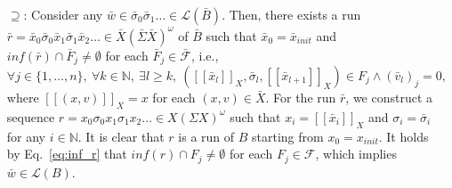 \begin{itemize}

	\item[$ \supseteq $:]
	Consider any $ \bar{w} \in \bar{\sigma}_0 \bar{\sigma}_1 \ldots \in \mathcal{L}(\bar{B}) $.
	Then, there exists a run $ \bar{r} = \bar{x}_0 \bar{\sigma}_0 \bar{x}_1 \bar{\sigma}_1 \bar{x}_2 \ldots \in \bar{X}(\bar{\Sigma} \bar{X})^\omega $ of $ \bar{B} $ such that $ \bar{x}_0 = \bar{x}_{init} $ and $ inf(\bar{r}) \cap \bar{F}_j \neq \emptyset $ for each $ \bar{F}_j \in \bar{\mathcal{F}} $, i.e.,
	\begin{equation}
	\label{eq:inf_r}
	\forall j \in \{1, \ldots, n\}, \
	\forall k \in \mathbb{N}, \ \exists l \geq k, \
	( [\![ \bar{x}_l ]\!]_X , \bar{\sigma}_l, [\![ \bar{x}_{l+1} ]\!]_X) \in F_j \land (\bar{v}_l)_j = 0 ,
	\end{equation}
	where $ [\![ (x,v) ]\!]_X = x $ for each $ (x,v) \in \bar{X} $.
	For the run $ \bar{r} $, we construct a sequence $ r = x_0 \sigma_0 x_1 \sigma_1 x_2 \ldots \in X(\Sigma X)^\omega $ such that $ x_i = [\![ \bar{x}_i ]\!]_X $ and $ \sigma_i = \bar{\sigma}_i $ for any $ i \in \mathbb{N} $.
	It is clear that $ r $ is a run of $ B $ starting from $ x_0 = x_{init} $.
	It holds by Eq.~\eqref{eq:inf_r} that $ inf(r) \cap F_j \neq \emptyset $ for each $ F_j \in \mathcal{F} $, which implies $ \bar{w} \in \mathcal{L}(B) $.
\end{itemize}
